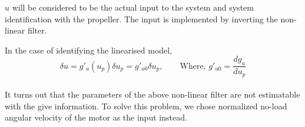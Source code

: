 $u$ will be considered to be the actual input to the system and system identification with the propeller. The input is implemented by inverting the non-linear filter.


In the case of identifying the linearised model,
$$\delta u = g'_u(u_{p}) \delta u_p = g'_{u0} \delta u_p,
\qquad \text{Where, } g'_{u0} = \frac{d g_u}{d u_p} $$\\

It turns out that the parameters of the above non-linear filter are not estimatable with the give information. To solve this problem, we chose normalized no-load angular velocity of the motor as the input instead.
